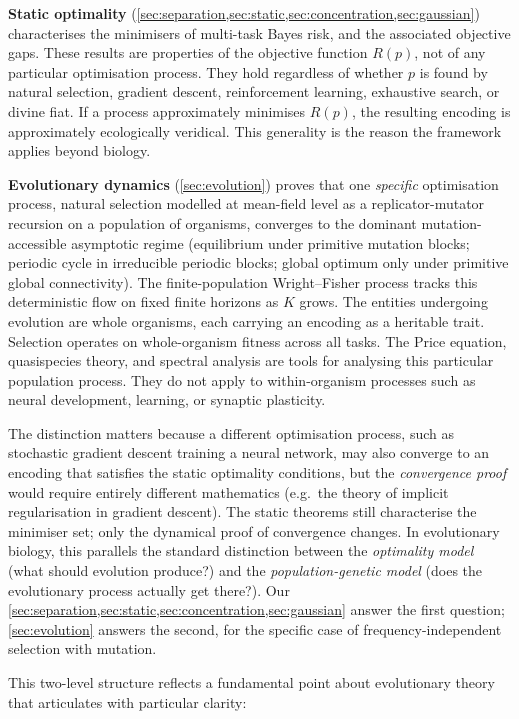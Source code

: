 \documentclass[12pt]{article}
\begin{document}
\textbf{Static optimality} (\cref{sec:separation,sec:static,sec:concentration,sec:gaussian}) characterises the minimisers of multi-task Bayes risk, and the associated objective gaps. These results are properties of the objective function $R(p)$, not of any particular optimisation process. They hold regardless of whether $p$ is found by natural selection, gradient descent, reinforcement learning, exhaustive search, or divine fiat. If a process approximately minimises $R(p)$, the resulting encoding is approximately ecologically veridical. This generality is the reason the framework applies beyond biology.

\textbf{Evolutionary dynamics} (\cref{sec:evolution}) proves that one \emph{specific} optimisation process, natural selection modelled at mean-field level as a replicator-mutator recursion on a population of organisms, converges to the dominant mutation-accessible asymptotic regime (equilibrium under primitive mutation blocks; periodic cycle in irreducible periodic blocks; global optimum only under primitive global connectivity). The finite-population Wright--Fisher process tracks this deterministic flow on fixed finite horizons as $K$ grows. The entities undergoing evolution are whole organisms, each carrying an encoding as a heritable trait. Selection operates on whole-organism fitness across all tasks. The Price equation, quasispecies theory, and spectral analysis are tools for analysing this particular population process. They do not apply to within-organism processes such as neural development, learning, or synaptic plasticity.

The distinction matters because a different optimisation process, such as stochastic gradient descent training a neural network, may also converge to an encoding that satisfies the static optimality conditions, but the \emph{convergence proof} would require entirely different mathematics (e.g.\ the theory of implicit regularisation in gradient descent). The static theorems still characterise the minimiser set; only the dynamical proof of convergence changes. In evolutionary biology, this parallels the standard distinction between the \emph{optimality model} (what should evolution produce?) and the \emph{population-genetic model} (does the evolutionary process actually get there?). Our \cref{sec:separation,sec:static,sec:concentration,sec:gaussian} answer the first question; \cref{sec:evolution} answers the second, for the specific case of frequency-independent selection with mutation.

This two-level structure reflects a fundamental point about evolutionary theory that \citet[pp.~362--363]{sober_2008} articulates with particular clarity:
\end{document}
